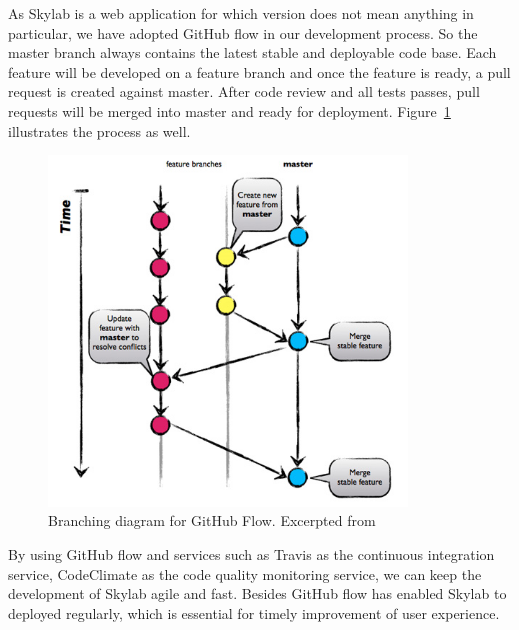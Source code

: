As Skylab is a web application for which version does not mean anything in particular, we have adopted GitHub flow in our development process\cite{citation8}. So the master branch always contains the latest stable and deployable code base. Each feature will be developed on a feature branch and once the feature is ready, a pull request is created against master. After code review and all tests passes, pull requests will be merged into master and ready for deployment. Figure~\ref{fig:GithubFlow} illustrates the process as well.

\begin{figure}[h]
  \centering
  \includegraphics[width=0.85\textwidth]{Images/Github_Flow_Branching_Model.png}
  \caption{Branching diagram for GitHub Flow. Excerpted from \cite{citation8}}
  \label{fig:GithubFlow}
\end{figure}

By using GitHub flow and services such as Travis as the continuous integration service, CodeClimate as the code quality monitoring service, we can keep the development of Skylab agile and fast. Besides GitHub flow has enabled Skylab to deployed regularly, which is essential for timely improvement of user experience\cite{citation9}.
